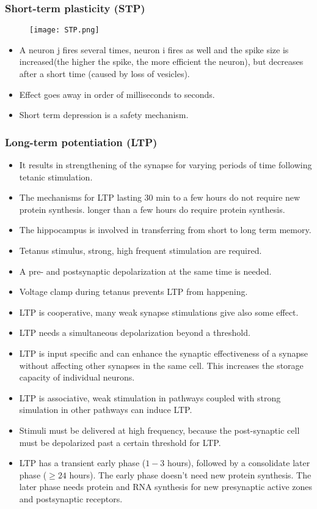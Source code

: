 \documentclass[main]{subfiles}
\begin{document}
\subsubsection{Short-term plasticity (STP)}
\begin{figure}[H]
	\texttt{[image: STP.png]}
\end{figure}
\begin{itemize}[noitemsep,nolistsep]
	\item A neuron j fires several times, neuron i fires as well and the spike size is increased(the higher the spike, the more efficient the neuron), but decreases after a short time (caused by loss of vesicles).
	\item Effect goes away in order of milliseconds to seconds.
	\item Short term depression is a safety mechanism.
\end{itemize}

\subsubsection{Long-term potentiation (LTP)}
\begin{itemize}
	\item It results in strengthening of the synapse for varying periods of time following tetanic stimulation.
	\item The mechanisms for LTP lasting 30 min to a few hours do not require new protein synthesis.
	\subitem longer than a few hours do require protein synthesis.
	\item The hippocampus is involved in transferring from short to long term memory.
	\item Tetanus stimulus, strong, high frequent stimulation are required.
	\item A pre- and postsynaptic depolarization at the same time is needed.
	\item Voltage clamp during tetanus prevents LTP from happening.
	\item LTP is cooperative, many weak synapse stimulations give also some effect.
	\item LTP needs a simultaneous depolarization beyond a threshold.
	\item LTP is input specific and can enhance the synaptic effectiveness of a synapse without affecting other synapses in the same cell. This increases the storage capacity of individual neurons.
	\item LTP is associative, weak stimulation in pathways coupled with strong simulation in other pathways can induce LTP.
	\item Stimuli must be delivered at high frequency, because the post-synaptic cell must be depolarized past a certain threshold for LTP.
	\item LTP has a transient early phase ($1-3$ hours), followed by a consolidate later phase ($\geq 24$ hours). The early phase doesn't need new protein synthesis. The later phase needs protein and RNA synthesis for new presynaptic active zones and postsynaptic receptors.
\end{itemize}
\end{document}
